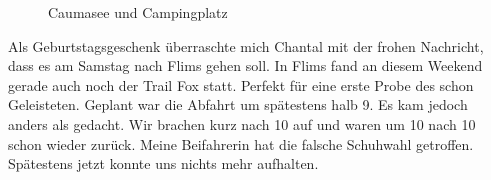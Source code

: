 \begin{figure}[b]
   \centering
   \quad
   \quad
   \quad
   \caption[Caumasee und Campingplatz]{Caumasee und Campingplatz}
\end{figure}

Als Geburtstagsgeschenk überraschte mich Chantal mit der frohen Nachricht, dass es am Samstag nach Flims gehen soll.
In Flims fand an diesem Weekend gerade auch noch der Trail Fox statt.
Perfekt für eine erste Probe des schon Geleisteten.
Geplant war die Abfahrt um spätestens halb 9.
Es kam jedoch anders als gedacht.
Wir brachen kurz nach 10 auf und waren um 10 nach 10 schon wieder zurück.
Meine Beifahrerin hat die falsche Schuhwahl getroffen.
Spätestens jetzt konnte uns nichts mehr aufhalten.

